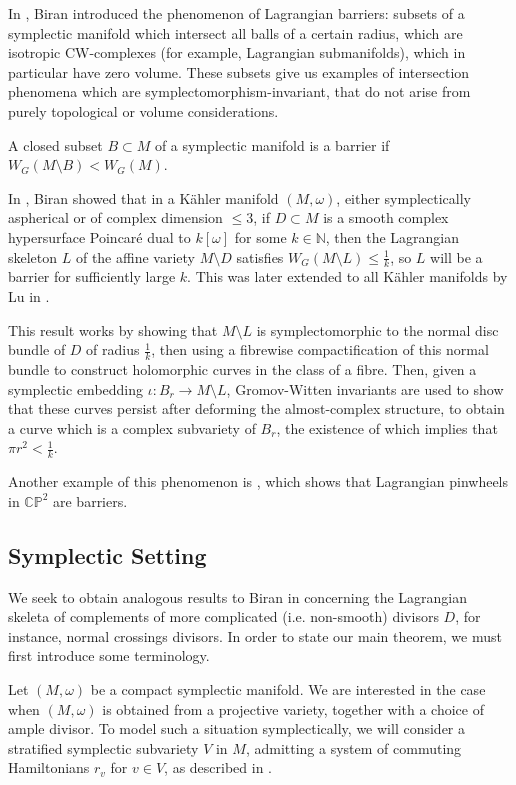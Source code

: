 \documentclass{article}
\numberwithin{equation}{section}
\numberwithin{figure}{section}
\begin{document}
In \cite{Biran}, Biran introduced the phenomenon of Lagrangian barriers: subsets of a symplectic manifold which intersect all balls of a certain radius, which are isotropic CW-complexes (for example, Lagrangian submanifolds), which in particular have zero volume. These subsets give us examples of intersection phenomena which are symplectomorphism-invariant, that do not arise from purely topological or volume considerations. 
\begin{defn}[Barrier]
A closed subset $B\subset M$ of a symplectic manifold is a barrier if $W_G(M\setminus B)<W_G(M)$.
\end{defn}
In \cite{Biran}, Biran showed that in a K\"ahler manifold $(M,\omega)$, either symplectically aspherical or of complex dimension $\leq 3$, if $D\subset M$ is a smooth complex hypersurface Poincar\'e dual to $k[\omega]$ for some $k\in\mathbb{N}$, then the Lagrangian skeleton $L$ of the affine variety $M\setminus D$ satisfies $W_G(M\setminus L)\leq \frac{1}{k}$, so $L$ will be a barrier for sufficiently large $k$. This was later extended to all K\"ahler manifolds by Lu in \cite{Lu}.

This result works by showing that $M\setminus L$ is symplectomorphic to the normal disc bundle of $D$ of radius $\frac{1}{k}$, then using a fibrewise compactification of this normal bundle to construct holomorphic curves in the class of a fibre. Then, given a symplectic embedding $\iota:B_r\rightarrow M\setminus L$, Gromov-Witten invariants are used to show that these curves persist after deforming the almost-complex structure, to obtain a curve which is a complex subvariety of $B_r$, the existence of which implies that $\pi r^2<\frac{1}{k}$.

Another example of this phenomenon is \cite{Bre}, which shows that Lagrangian pinwheels in $\mathbb{CP}^2$ are barriers. 

\subsection{Symplectic Setting}
We seek to obtain analogous results to Biran in \cite{Biran} concerning the Lagrangian skeleta of complements of more complicated (i.e. non-smooth) divisors $D$, for instance, normal crossings divisors. In order to state our main theorem, we must first introduce some terminology.

Let $(M,\omega)$ be a compact symplectic manifold. We are interested in the case when $(M,\omega)$ is obtained from a projective variety, together with a choice of ample divisor. To model such a situation symplectically, we will consider a stratified symplectic subvariety $V$ in $M$, admitting a system of commuting Hamiltonians $r_v$ for $v\in V$, as described in \cite{Ga}.
\end{document}
